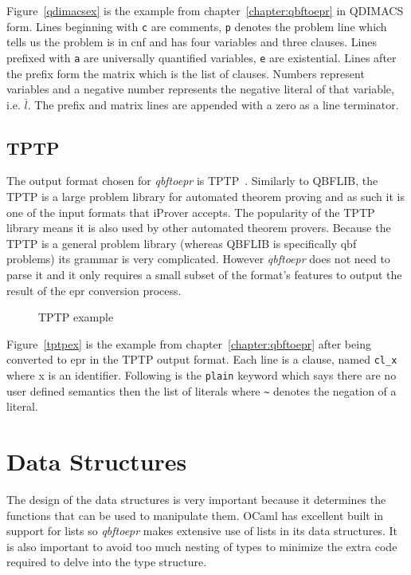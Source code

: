 Figure~\ref{qdimacsex} is the example from chapter~\ref{chapter:qbftoepr} in QDIMACS form. Lines beginning with \texttt{c} are comments, \texttt{p} denotes the problem line which tells us the problem is in \gls{cnf} and has four variables and three clauses. Lines prefixed with \texttt{a} are universally quantified variables, \texttt{e} are existential. Lines after the prefix form the matrix which is the list of clauses. Numbers represent variables and a negative number represents the negative literal of that variable, i.e. $\bar{l}$. The prefix and matrix lines are appended with a zero as a line terminator.

\subsection{TPTP}
The output format chosen for \textit{qbftoepr} is TPTP~\cite{tptp}. Similarly to QBFLIB, the TPTP is a large problem library for automated theorem proving and as such it is one of the input formats that iProver accepts. The popularity of the TPTP library means it is also used by other automated theorem provers. Because the TPTP is a general problem library (whereas QBFLIB is specifically \gls{qbf} problems) its grammar is very complicated. However \textit{qbftoepr} does not need to parse it and it only requires a small subset of the format's features to output the result of the \gls{epr} conversion process.

\begin{figure}[H]
\caption{TPTP example}
\begin{CenteredBox}

\end{CenteredBox}
\end{figure}

Figure~\ref{tptpex} is the example from chapter~\ref{chapter:qbftoepr} after being converted to \gls{epr} in the TPTP output format. Each line is a clause, named \texttt{cl\_x} where x is an identifier. Following is the \texttt{plain} keyword which says there are no user defined semantics then the list of literals where \texttt{\textasciitilde} denotes the negation of a literal.

\section{Data Structures} \label{datastructures}
The design of the data structures is very important because it determines the functions that can be used to manipulate them. OCaml has excellent built in support for lists so \textit{qbftoepr} makes extensive use of lists in its data structures. It is also important to avoid too much nesting of types to minimize the extra code required to delve into the type structure.

